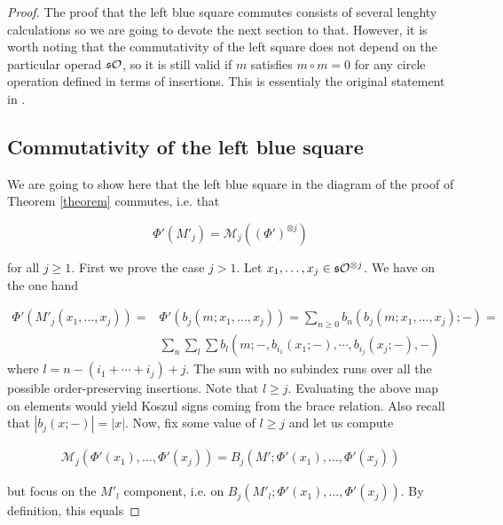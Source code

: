 \documentclass[join.tex]{subfiles}
\begin{document}
\begin{proof}

The proof that the left blue square commutes consists of several lenghty calculations so we are going to devote the next section to that. However, it is worth noting that the commutativity of the left square does not depend on the particular operad $\mathfrak{s}{\mathcal O}$, so it is still valid if $m$ satisfies $m\circ m=0$ for any circle operation defined in terms of insertions. This is essentialy the original statement in \cite{GV}.
\subsection*{Commutativity of the left blue square}
We are going to show here that the left blue square in the diagram of the proof of Theorem \ref{theorem} commutes, i.e. that 

\begin{equation}\label{commutative}
\Phi'(M'_j)=\mathcal{M}_j((\Phi')^{\otimes j})
\end{equation}

for all $j\geq 1$. First we prove the case $j>1$. Let $x_1,\dots, x_j\in \mathfrak{s}{\mathcal O}^{\otimes j}$. We have on the one hand



\begin{align*}
\Phi'(M'_j(x_1,\dots, x_j))=&\Phi'(b_j(m;x_1,\dots, x_j))=\sum_{n\geq 0} b_n(b_j(m;x_1,\dots, x_j);-)=\\
&\sum_n\sum_l\sum b_l(m; -, b_{i_1}(x_1;-),\cdots,b_{i_j}(x_j;-),-)
\end{align*}
where $l=n-(i_1+\cdots+i_j)+j$. The sum with no subindex runs over all the possible order-preserving insertions. Note that $l\geq j$. Evaluating the above map on elements would yield Koszul signs coming from the brace relation. Also recall that $|b_j(x;-)|=|x|$. Now, fix some value of $l\geq j$ and let us compute

\begin{align*}
\mathcal{M}_j(\Phi'(x_1),\dots, \Phi'(x_j))=B_j(M';\Phi'(x_1),\dots, \Phi'(x_j))
\end{align*}

but focus on the $M'_l$ component, i.e. on $B_j(M'_l;\Phi'(x_1),\dots, \Phi'(x_j))$. By definition, this equals


\end{proof}
\end{document}
